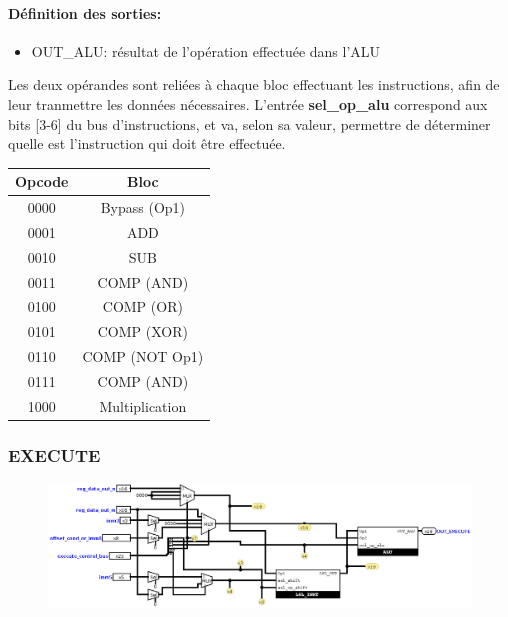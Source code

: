 \documentclass[a4paper]{article} %
\begin{document}
\paragraph{Définition des sorties:}
\begin{itemize}
    \item     OUT\_ALU: résultat de l'opération effectuée dans l'ALU
\end{itemize}
\medskip
Les deux opérandes sont reliées à chaque bloc effectuant les instructions, afin de leur tranmettre les données nécessaires. L'entrée \textbf{sel\_op\_alu} correspond aux bits [3-6] du bus d'instructions, et va, selon sa valeur, permettre de déterminer quelle est l'instruction qui doit être effectuée.\\
\smallbreak
\begin{tabular}{|c|c|}
    \hline
        Opcode & Bloc \\
        \hline
        0000   & Bypass (Op1) \\
        \hline
        0001   & ADD\\
        \hline
        0010   & SUB \\
        \hline
        0011   & COMP (AND) \\
        \hline
        0100   & COMP (OR) \\
        \hline
        0101   & COMP (XOR) \\
        \hline
        0110   & COMP (NOT Op1) \\
         \hline
        0111   & COMP (AND) \\
        \hline
        1000   & Multiplication\\
        \hline    
\end{tabular}
\subsubsection{EXECUTE} \label{execute}
\begin{figure}[H]
    \centering
    \includegraphics[width=1\textwidth]{src/EXECUTE.png}
    \label{fig:execute_pic}
\end{figure}
\end{document}
